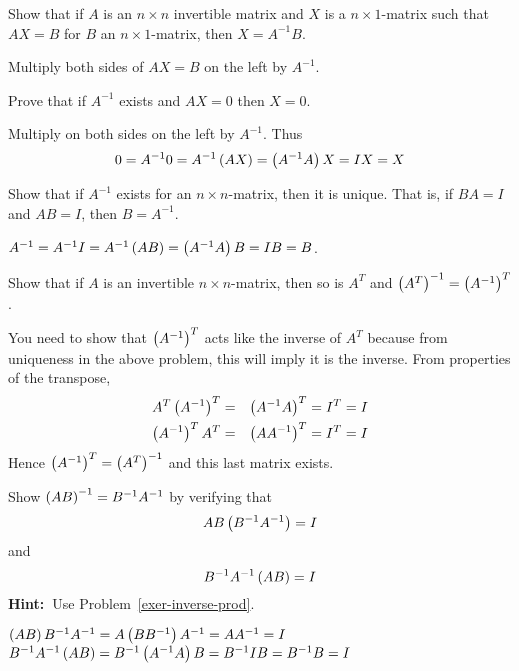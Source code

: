 \begin{enumialphparenastyle}
\begin{ex}Show that if $A$ is an $n\times n$ invertible matrix and $X$
is a $n\times 1$-matrix such that $AX=B$ for $B$ an 
$n\times 1$-matrix, then $X=A^{-1}B$. 
\begin{sol}
Multiply both sides of $AX=B$ on the left by $A^{-1}$.
\end{sol}
\end{ex}

\begin{ex}Prove that if $A^{-1}$ exists and $AX=0$ then $X=0$. 
\begin{sol}
Multiply on both sides on the left by $A^{-1}$. Thus
\[
0=A^{-1}0=A^{-1}\left(AX\right) =\left(
A^{-1}A\right) X=IX = X
\]
\end{sol}
\end{ex}

\begin{ex}\label{exer-inverse-prod}Show that if $A^{-1}$ exists for an $n\times n$-matrix, then it is unique. That is, if $BA=I$ and $AB=I$, then $B=A^{-1}$. 
\begin{sol}
 $A^{-1}=A^{-1}I=A^{-1}\left(AB\right) =\left(A^{-1}A\right) B=IB=B$.
\end{sol}
\end{ex}

\begin{ex}Show that if $A$ is an invertible $n\times n$-matrix, then so is 
$A^{T} $ and $\left(A^{T}\right) ^{-1}=\left(A^{-1}\right) ^{T}$. 
\begin{sol}
 You need to show that $\left(A^{-1}\right) ^{T}$ acts like the inverse of $A^{T}
$ because from uniqueness in the above problem, this will imply it is the
inverse. From properties of the transpose,
\begin{eqnarray*}
A^{T}\left(A^{-1}\right) ^{T} &=&\left(A^{-1}A\right) ^{T}=I^{T}=I \\
\left(A^{-1}\right) ^{T}A^{T} &=&\left(AA^{-1}\right) ^{T}=I^{T}=I
\end{eqnarray*}
Hence $\left(A^{-1}\right) ^{T}=\left(A^{T}\right) ^{-1}$ and this last
matrix exists.
\end{sol}
\end{ex}

\begin{ex}Show $\left(AB\right) ^{-1}=B^{-1}A^{-1}$ by verifying that 
\begin{equation*}
AB\left(
B^{-1}A^{-1}\right) =I
\end{equation*} and 
\begin{equation*}
B^{-1}A^{-1}\left(AB\right) =I
\end{equation*}
\textbf{Hint:\ }Use Problem~\ref{exer-inverse-prod}.
\begin{sol}
$\left(AB\right)
B^{-1}A^{-1}=A\left(BB^{-1}\right) A^{-1}=AA^{-1}=I$ $B^{-1}A^{-1}\left(
AB\right) =B^{-1}\left(A^{-1}A\right) B=B^{-1}IB=B^{-1}B=I$
\end{sol}
\end{ex}


\end{enumialphparenastyle}
